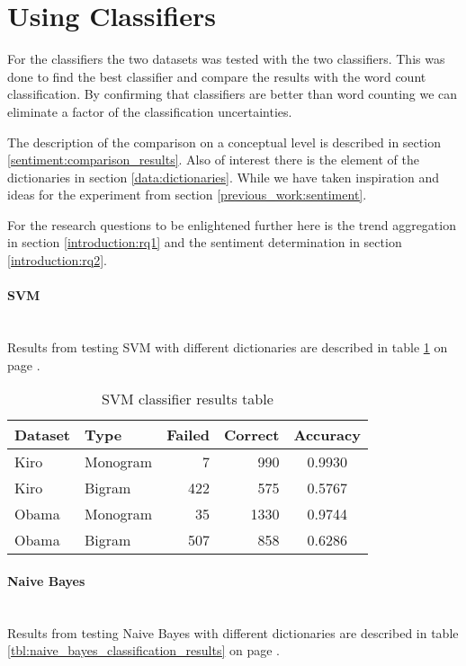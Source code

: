 \section{Using Classifiers}\label{experiments:calssifiers}
For the classifiers the two datasets was tested with the two classifiers.
This was done to find the best classifier and compare the results
with the word count classification. By confirming that classifiers are better
than word counting we can eliminate a factor of the classification
uncertainties. 

The description of the comparison on a conceptual level is described in section
\ref{sentiment:comparison_results}. Also of interest there is the element of
the dictionaries in section \ref{data:dictionaries}. While we have taken
inspiration and ideas for the experiment from section
\ref{previous_work:sentiment}.

For the research questions to be enlightened further here is the trend
aggregation in section \ref{introduction:rq1} and the sentiment determination
in section \ref{introduction:rq2}.

\paragraph{SVM}\label{experiments:svm_classification}
\hspace{0pt}\\
Results from testing SVM with different dictionaries are described in table
\ref{tbl:svm_classifier_results} on page
\pageref{tbl:svm_classifier_results}.

\begin{table}
\centering
\label{tbl:svm_classifier_results}
\caption{SVM classifier results table}
\begin{tabular}{ l l r r c }
Dataset & Type & Failed & Correct & Accuracy \\
\hline
Kiro & Monogram & 7 & 990 & 0.9930 \\
Kiro & Bigram & 422 & 575 & 0.5767 \\
Obama & Monogram & 35 & 1330 & 0.9744 \\
Obama & Bigram & 507 & 858 & 0.6286 \\
\end{tabular}
\end{table}

\paragraph{Naive Bayes}\label{experiments:naive_bayes_classification}
\hspace{0pt}\\
Results from testing Naive Bayes with different dictionaries are described in
table \ref{tbl:naive_bayes_classification_results} on page
\pageref{tbl:naive_bayes_classification_results}.

